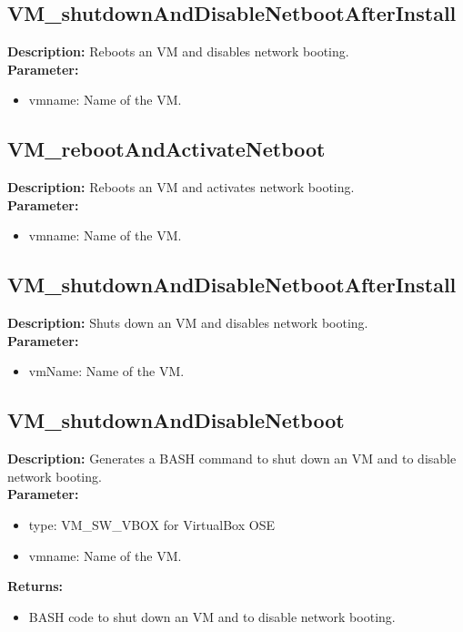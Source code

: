 \subsection{VM\_shutdownAndDisableNetbootAfterInstall}
\textbf{Description:} Reboots an VM and disables network booting.\\
\textbf{Parameter:}
\begin{itemize}
\item vmname: Name of the VM.
\end{itemize}

\subsection{VM\_rebootAndActivateNetboot}
\textbf{Description:} Reboots an VM and activates network booting.\\
\textbf{Parameter:}
\begin{itemize}
\item vmname: Name of the VM.
\end{itemize}

\subsection{VM\_shutdownAndDisableNetbootAfterInstall}
\textbf{Description:} Shuts down an VM and disables network booting.\\
\textbf{Parameter:}
\begin{itemize}
\item vmName: Name of the VM.
\end{itemize}

\subsection{VM\_shutdownAndDisableNetboot}
\textbf{Description:} Generates a BASH command to shut down an VM and to disable network booting.\\
\textbf{Parameter:}
\begin{itemize}
\item type: VM\_SW\_VBOX for VirtualBox OSE
\item vmname: Name of the VM.
\end{itemize}
\textbf{Returns:}
\begin{itemize}
\item BASH code to shut down an VM and to disable network booting.
\end{itemize}

